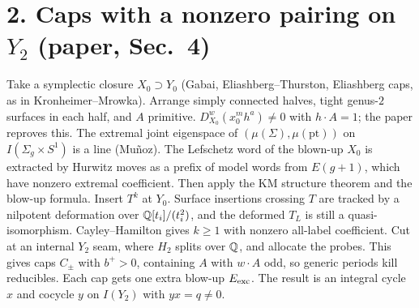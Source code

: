 \documentclass[10pt]{amsart}
\begin{document}
\section*{2. Caps with a nonzero pairing on $Y_2$ (paper, Sec.~4)}
Take a symplectic closure $X_0\supset Y_0$ (Gabai, Eliashberg--Thurston,
Eliashberg caps, as in Kronheimer--Mrowka). Arrange simply connected halves,
tight genus-$2$ surfaces in each half, and $A$ primitive.
$D^w_{X_0}(x_0^mh^a)\ne0$ with $h\cdot A=1$; the paper reproves this. The
extremal joint eigenspace of $(\mu(\Sigma),\mu(\mathrm{pt}))$ on
$I(\Sigma_g\times S^1)$ is a line (Mu\~noz). The Lefschetz word of the blown-up
$X_0$ is extracted by Hurwitz moves as a prefix of model words from
$E(g+1)$, which have nonzero extremal coefficient. Then apply the KM structure
theorem and the blow-up formula.
Insert $T^k$ at $Y_0$. Surface insertions crossing $T$ are tracked by a
nilpotent deformation over $\mathbb Q[t_i]/(t_i^2)$, and the deformed $T_L$ is still
a quasi-isomorphism. Cayley--Hamilton gives $k\ge1$ with nonzero all-label
coefficient. Cut at an internal $Y_2$ seam, where $H_2$ splits over $\mathbb Q$, and
allocate the probes. This gives caps $C_\pm$ with $b^+>0$, containing $A$
with $w\cdot A$ odd, so generic periods kill reducibles. Each cap gets one
extra blow-up $E_{\rm exc}$. The result is an integral cycle $x$ and cocycle
$y$ on $I(Y_2)$ with $yx=q\ne0$.
\end{document}
